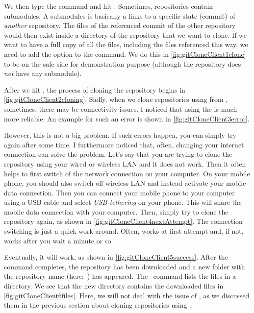 We then type the command  and hit \keys{\return}.
Sometimes, repositories contain submodules.
A submodules is basically a links to a specific state (commit) of \emph{another} repository.
The files of the referenced commit of the other repository would then exist inside a directory of the repository that we want to clone.
If we want to have a full copy of all the files, including the files referenced this way, we need to add the option  to the  command.
We do this in \cref{fig:gitCloneClient1clone} to be on the safe side for demonstration purpose (although the repository  does \emph{not} have any submodule).

After we hit \keys{\return}, the process of cloning the repository begins in \cref{fig:gitCloneClient2cloning}.
Sadly, when we clone repositories using   from \github, sometimes, there may be connectivity issues.
I noticed that using the   is much more reliable.
An example for such an error is shown in \cref{fig:gitCloneClient3error}.

However, this is not a big problem.
If such errors happen, you can simply try again after some time.
I furthermore noticed that, often, changing your internet connection can solve the problem.
Let's say that you are trying to clone the repository using your wired or wireless LAN and it does not work.
Then it often helps to first switch of the network connection on your computer.
On your mobile phone, you should also switch off wireless LAN and instead activate your mobile data connection.
Then you can connect your mobile phone to your computer using a USB cable and select \emph{USB tethering} on your phone.
This will share the mobile data connection with your computer.
Then, simply try to clone the repository again, as shown in \cref{fig:gitCloneClient4nextAttempt}.
The connection switching is just a quick work around.
Often,  works at first attempt and, if not, works after you wait a minute or so.

Eventually, it will work, as shown in \cref{fig:gitCloneClient5success}.
After the  command completes, the repository has been downloaded and a new folder with the repository name (here:~) has appeared.
The \bash\ command  lists the files in a directory.
We see that the new directory contains the downloaded files in \cref{fig:gitCloneClient6files}.
Here, we will not deal with the issue of , as we discussed them in the previous section about cloning repositories using \pycharm.%
%
\FloatBarrier%
\endhsection%
